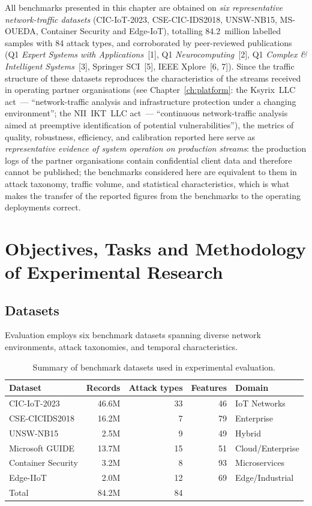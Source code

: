 All benchmarks presented in this chapter are obtained on \emph{six
representative network-traffic datasets} (CIC-IoT-2023,
CSE-CIC-IDS2018, UNSW-NB15, MS-OUEDA, Container Security and
Edge-IoT), totalling 84.2~million labelled samples with 84 attack
types, and corroborated by peer-reviewed publications (Q1
\emph{Expert Systems with Applications}~[1], Q1
\emph{Neurocomputing}~[2], Q1 \emph{Complex \& Intelligent
Systems}~[3], Springer SCI~[5], IEEE Xplore~[6, 7]). Since the
traffic structure of these datasets reproduces the characteristics
of the streams received in operating partner organisations (see
Chapter~\ref{ch:platform}: the Ksyrix~LLC act~--- ``network-traffic
analysis and infrastructure protection under a changing
environment''; the NII~IKT~LLC act~--- ``continuous network-traffic
analysis aimed at preemptive identification of potential
vulnerabilities''), the metrics of quality, robustness, efficiency,
and calibration reported here serve as \emph{representative
evidence of system operation on production streams}: the
production logs of the partner organisations contain confidential
client data and therefore cannot be published; the benchmarks
considered here are equivalent to them in attack taxonomy, traffic
volume, and statistical characteristics, which is what makes the transfer of the reported figures from the benchmarks to the operating deployments correct.

\section{Objectives, Tasks and Methodology of Experimental Research}
\label{sec:exp_methodology}%

\subsection{Datasets}

Evaluation employs six benchmark datasets spanning diverse network environments, attack taxonomies, and temporal characteristics.

\begin{table}[htbp]\centering\small
\caption{Summary of benchmark datasets used in experimental evaluation.}
\label{tab:datasets}
\renewcommand{\arraystretch}{0.92}\begin{tabular}{lrrrl}
\toprule
Dataset & Records & Attack types & Features & Domain \\
\midrule
CIC-IoT-2023      & 46.6M & 33 & 46 & IoT Networks \\
CSE-CICIDS2018     & 16.2M &  7 & 79 & Enterprise \\
UNSW-NB15          &  2.5M &  9 & 49 & Hybrid \\
Microsoft GUIDE    & 13.7M & 15 & 51 & Cloud/Enterprise \\
Container Security &  3.2M &  8 & 93 & Microservices \\
Edge-IIoT          &  2.0M & 12 & 69 & Edge/Industrial \\
\midrule
Total              & 84.2M & 84 &    & \\
\bottomrule
\end{tabular}\end{table}

